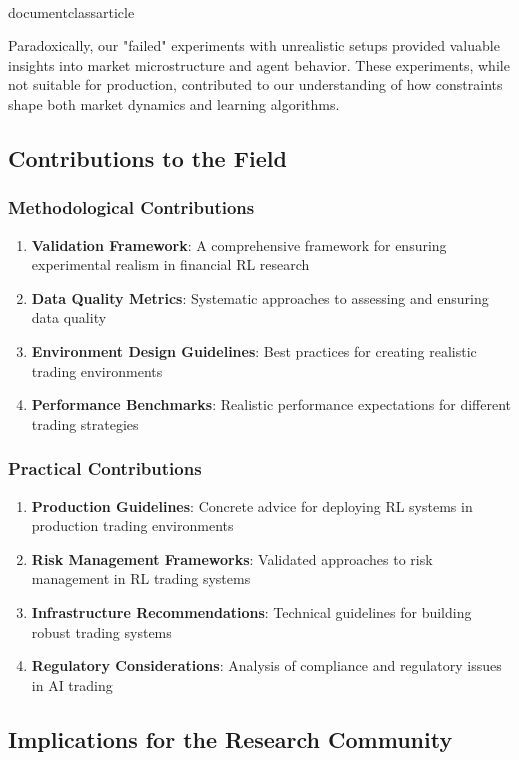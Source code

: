 \\documentclass{article}
\begin{document}
Paradoxically, our "failed" experiments with unrealistic setups provided valuable insights into market microstructure and agent behavior. These experiments, while not suitable for production, contributed to our understanding of how constraints shape both market dynamics and learning algorithms.

\subsection{Contributions to the Field}

\subsubsection{Methodological Contributions}

\begin{enumerate}
\item \textbf{Validation Framework}: A comprehensive framework for ensuring experimental realism in financial RL research
\item \textbf{Data Quality Metrics}: Systematic approaches to assessing and ensuring data quality
\item \textbf{Environment Design Guidelines}: Best practices for creating realistic trading environments
\item \textbf{Performance Benchmarks}: Realistic performance expectations for different trading strategies
\end{enumerate}

\subsubsection{Practical Contributions}

\begin{enumerate}
\item \textbf{Production Guidelines}: Concrete advice for deploying RL systems in production trading environments
\item \textbf{Risk Management Frameworks}: Validated approaches to risk management in RL trading systems
\item \textbf{Infrastructure Recommendations}: Technical guidelines for building robust trading systems
\item \textbf{Regulatory Considerations}: Analysis of compliance and regulatory issues in AI trading
\end{enumerate}

\subsection{Implications for the Research Community}
\end{document}
